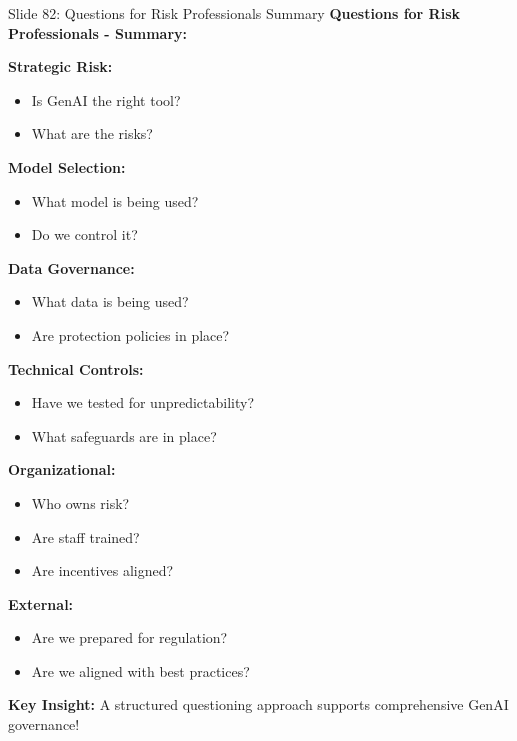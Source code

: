 \documentclass[8pt]{beamer}
\begin{document}
	\begin{frame}{Slide 82: Questions for Risk Professionals Summary}
		\fontsize{6.5}{7.5}\selectfont
		\textbf{Questions for Risk Professionals - Summary:}
		
		\vspace{0.1cm}
		\textbf{Strategic Risk:}
		\begin{itemize}
			\item Is GenAI the right tool?
			\item What are the risks?
		\end{itemize}
		
		\vspace{0.1cm}
		\textbf{Model Selection:}
		\begin{itemize}
			\item What model is being used?
			\item Do we control it?
		\end{itemize}
		
		\vspace{0.1cm}
		\textbf{Data Governance:}
		\begin{itemize}
			\item What data is being used?
			\item Are protection policies in place?
		\end{itemize}
		
		\vspace{0.1cm}
		\textbf{Technical Controls:}
		\begin{itemize}
			\item Have we tested for unpredictability?
			\item What safeguards are in place?
		\end{itemize}
		
		\vspace{0.1cm}
		\textbf{Organizational:}
		\begin{itemize}
			\item Who owns risk?
			\item Are staff trained?
			\item Are incentives aligned?
		\end{itemize}
		
		\vspace{0.1cm}
		\textbf{External:}
		\begin{itemize}
			\item Are we prepared for regulation?
			\item Are we aligned with best practices?
		\end{itemize}
		
		\textcolor{myblue}{\textbf{Key Insight:}} A structured questioning approach \textcolor{myblue}{supports comprehensive GenAI governance}!
	\end{frame}
	
\end{document}
